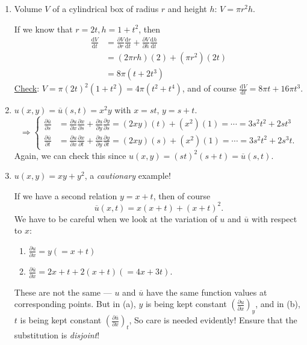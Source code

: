 \documentclass[12pt]{report}
\theoremstyle{definition}
\begin{document}
\begin{enumerate}[label = (\roman*)]
    \item Volume $V$ of a cylindrical box of radius $r$ and height $h$: $V = \pi r^{2}h$.

        If we know that $r = 2t, h = 1 + t^{2}$, then\[
            \begin{align*}
                \frac{\mathrm{d}V}{\mathrm{d}t} & = \frac{\partial V}{\partial r} \frac{\mathrm{d}r}{\mathrm{d}t} 
                + \frac{\partial V}{\partial h} \frac{\mathrm{d}h}{\mathrm{d}t} \\
                                                & = (2\pi rh)(2) + (\pi r^{2})(2t) \\
                                                & = 8\pi (t + 2t^{3})
            \end{align*}
        \]
        \underline{Check}: $V = \pi{(2t)}^{2}(1+t^{2}) = 4\pi(t^{2}+t^{4})$,
        and of course $\frac{\mathrm{d}V}{\mathrm{d}t} = 8\pi t + 16\pi t^{3}$.

    \item $u(x,y) = \overline{u}(s,t) = x^{2}y$ with $x = st$, $y = s + t$.
        \[
            \Rightarrow{}\left\{\begin{align*}
                    \frac{\partial \overline{u}}{\partial s} & = \frac{\partial u}{\partial x} 
                    \frac{\partial x}{\partial s} + \frac{\partial u}{\partial y} \frac{\partial y}{\partial s} 
                    = (2xy)(t) + (x^{2})(1) = \cdots = 3s^{2}t^{2} + 2st^{3} \\
                    \frac{\partial \overline{u}}{\partial t} & = \frac{\partial u}{\partial x}
                    \frac{\partial x}{\partial t} + \frac{\partial u}{\partial y} \frac{\partial y}{\partial t}
                    = (2xy)(s) + (x^{2})(1) = \cdots = 3s^{2}t^{2} + 2s^{3}t.
            \end{align*}\right.
        \]
        Again, we can check this since $u(x,y) = {(st)}^{2}(s+t) = \overline{u}(s,t)$.

    \item $u(x,y) = xy + y^{2}$, a \emph{cautionary} example!

        If we have a second relation $y = x + t$, then of course\[
            \overline{u}(x,t) = x(x+t) + {(x + t)}^{2}.
        \]
        We have to be careful when we look at the variation of $u$ and $\overline{u}$ with respect to $x$:
        \begin{enumerate}[label = (\alph*)]
            \item $\frac{\partial u}{\partial x} = y (= x + t)$
            \item $\frac{\partial \overline{u}}{\partial x} = 2x + t + 2(x + t) (= 4x + 3t)$.
        \end{enumerate}
        These are not the same --- $u$ and $\overline{u}$ have the same function values
        at corresponding points. But in (a), $y$ is being kept constant ${\left(\frac{\partial u}{\partial x} \right)}_{y}$,
        and in (b), $t$ is being kept constant ${\left(\frac{\partial \overline{u}}{\partial x} \right)}_{t}$,
        So care is needed evidently! Ensure that the substitution is \emph{disjoint}!
\end{enumerate}
\end{document}
